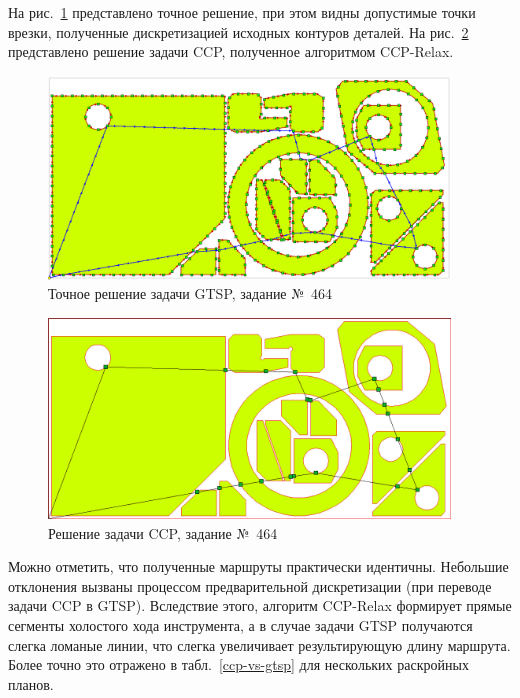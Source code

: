 \documentclass[10pt]{SPIIRAS_Proceedings}
\begin{document}
На рис.~\ref{gtsp-path}
представлено точное решение,
при этом видны допустимые точки врезки,
полученные дискретизацией исходных контуров деталей.
На рис.~\ref{ccp-path}
представлено решение задачи CCP,
полученное алгоритмом CCP-Relax.

\begin{figure}
  \begin{center}
    \includegraphics[width=0.95\textwidth]{464-gtsp.png}
  \end{center}
  \caption{Точное решение задачи GTSP, задание №~464}
  \label{gtsp-path}
\end{figure}

\begin{figure}
  \begin{center}
    \includegraphics[width=0.95\textwidth]{464-ccp.png}
  \end{center}
  \caption{Решение задачи CCP, задание №~464}
  \label{ccp-path}
\end{figure}

Можно отметить,
что полученные маршруты практически идентичны.
Небольшие отклонения вызваны процессом предварительной дискретизации
(при переводе задачи CCP в GTSP).
Вследствие этого,
алгоритм CCP-Relax формирует прямые сегменты
холостого хода инструмента,
а в случае задачи GTSP
получаются слегка ломаные линии,
что слегка увеличивает результирующую длину маршрута.
Более точно это отражено в табл.~\ref{ccp-vs-gtsp}
для нескольких раскройных планов.
\end{document}
